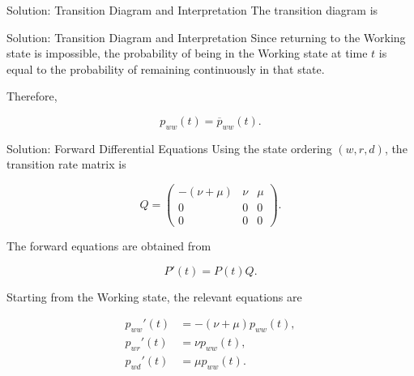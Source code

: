 \documentclass[
  ignorenonframetext,
  aspectratio=169,
]{beamer}
\begin{document}
\begin{frame}{Solution: Transition Diagram and Interpretation}
\protect{}\label{solution-transition-diagram-and-interpretation}
The transition diagram is

\begin{center}
\end{center}
\end{frame}

\begin{frame}{Solution: Transition Diagram and Interpretation}
\protect{}\label{solution-transition-diagram-and-interpretation-1}
Since returning to the Working state is impossible, the probability of
being in the Working state at time \(t\) is equal to the probability of
remaining continuously in that state.

Therefore,

\[
\boxed{
p_{ww}(t)=\overline p_{ww}(t).
}
\]
\end{frame}

\begin{frame}{Solution: Forward Differential Equations}
\protect{}\label{solution-forward-differential-equations}
Using the state ordering \((w,r,d)\), the transition rate matrix is

\[
Q=
\begin{pmatrix}
-(\nu+\mu) & \nu & \mu\\
0 & 0 & 0\\
0 & 0 & 0
\end{pmatrix}.
\]

The forward equations are obtained from

\[
P'(t)=P(t)Q.
\]

Starting from the Working state, the relevant equations are

\[
\begin{aligned}
p_{ww}'(t)
&=-(\nu+\mu)p_{ww}(t),\\
p_{wr}'(t)
&=\nu p_{ww}(t),\\
p_{wd}'(t)
&=\mu p_{ww}(t).
\end{aligned}
\]
\end{frame}
\end{document}
